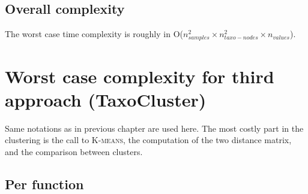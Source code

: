 \documentclass{report}
\begin{document}
\subsection{Overall complexity}

The worst case time complexity is roughly in O($n_{samples}^{2} \times n_{taxo-nodes}^{2} \times n_{values}$).

\section{Worst case complexity for third approach (TaxoCluster)}

Same notations as in previous chapter are used here. The most costly part in the clustering is the call to \textsc{K-means}, the computation of the two distance matrix, and the comparison between clusters.\\

\subsection{Per function}
\end{document}

